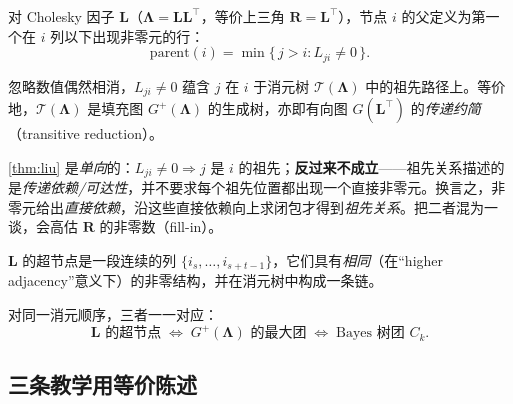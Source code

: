 \begin{definition}
\label{def:elim-tree}
对 Cholesky 因子 $\mathbf{L}$（$\boldsymbol{\Lambda}=\mathbf{L}\mathbf{L}^\top$，等价上三角 $\mathbf{R}=\mathbf{L}^\top$），节点 $i$ 的父定义为第一个在 $i$ 列以下出现非零元的行：
\begin{equation}
  \mathrm{parent}(i)=\min\{\,j>i:L_{ji}\neq 0\,\}.
  \label{eq:elim-tree-parent}
\end{equation}
\end{definition}

\begin{theorem}
\label{thm:liu}
忽略数值偶然相消，$L_{ji}\neq 0$ 蕴含 $j$ 在 $i$ 于消元树 $\mathcal{T}(\boldsymbol{\Lambda})$ 中的祖先路径上。等价地，$\mathcal{T}(\boldsymbol{\Lambda})$ 是填充图 $G^+(\boldsymbol{\Lambda})$ 的生成树，亦即有向图 $G(\mathbf{L}^\top)$ 的\emph{传递约简}（transitive reduction）。
\end{theorem}

\begin{pitfall}
\cref{thm:liu} 是\emph{单向}的：$L_{ji}\neq 0\Rightarrow j$ 是 $i$ 的祖先；\textbf{反过来不成立}——祖先关系描述的是\emph{传递依赖/可达性}，并不要求每个祖先位置都出现一个直接非零元。换言之，非零元给出\emph{直接依赖}，沿这些直接依赖向上求闭包才得到\emph{祖先关系}。把二者混为一谈，会高估 $\mathbf{R}$ 的非零数（fill-in）。
\end{pitfall}

\begin{definition}
\label{def:supernode}
$\mathbf{L}$ 的超节点是一段连续的列 $\{i_s,\dots,i_{s+t-1}\}$，它们具有\emph{相同}（在“higher adjacency”意义下）的非零结构，并在消元树中构成一条链。
\end{definition}

\begin{theorem}[Bayes 树团 $=$ 超节点 $=$ 弦图最大团\cite{pothen1990compact,kaess2012isam2}]
\label{thm:supernode-equiv}
对同一消元顺序，三者一一对应：
\begin{equation}
  \text{$\mathbf{L}$ 的超节点}\;\Longleftrightarrow\;\text{$G^+(\boldsymbol{\Lambda})$ 的最大团}\;\Longleftrightarrow\;\text{Bayes 树团 }C_k.
  \label{eq:supernode-equiv}
\end{equation}
\end{theorem}

\subsection{三条教学用等价陈述}
\label{sec:isam-three-equiv}

